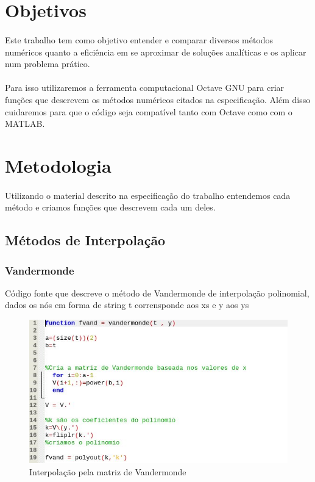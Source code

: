 \documentclass{article}
\begin{document}
\section{Objetivos}
\paragraph{}Este trabalho tem como objetivo entender e comparar diversos m\'etodos num\'ericos quanto a efici\^encia em se aproximar de solu\c c\~oes anal\'iticas e 
os aplicar num problema pr\'atico.
\paragraph{}Para isso utilizaremos a ferramenta computacional Octave GNU para criar fun\c c\~oes que descrevem os m\'etodos num\'ericos citados na especifica\c c\~ao.
Al\'em disso cuidaremos para que o c\'odigo seja compat\'ivel tanto com Octave como com o MATLAB.

\newpage
\section{Metodologia}
\paragraph{}Utilizando o material descrito na especifica\c c\~ao do trabalho entendemos cada m\'etodo e criamos fun\c c\~oes que descrevem cada um deles.
	\subsection{M\'etodos de Interpola\c c\~ao}
		\subsubsection{Vandermonde}
		C\'odigo fonte que descreve o m\'etodo de Vandermonde de interpola\c c\~ao polinomial, dados os n\'os em forma de string t corrensponde aos xs e 
		y aos ys
			\begin{figure}[h!]
			\includegraphics[width=\linewidth]{Vandermonde.jpg}
			\caption{Interpola\c c\~ao pela matriz de Vandermonde}
			\end{figure}
\newpage
\end{document}

